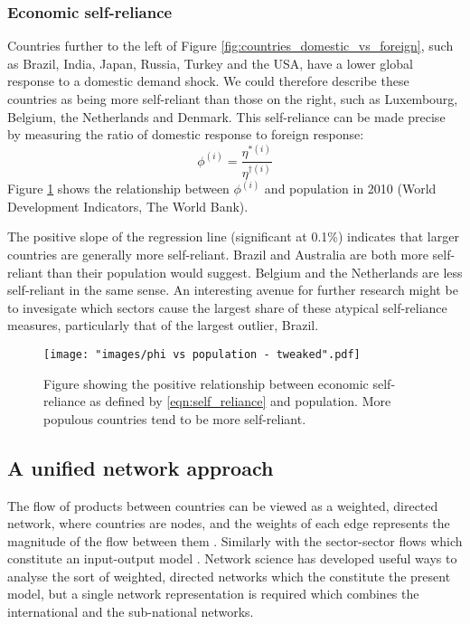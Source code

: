 \documentclass[a4paper]{article}
\begin{document}
\subsubsection*{Economic self-reliance}
Countries further to the left of Figure \ref{fig:countries_domestic_vs_foreign}, such as Brazil, India, Japan, Russia, Turkey and the USA, have a lower global response to a domestic demand shock.
We could therefore describe these countries as being more self-reliant than those on the right, such as Luxembourg, Belgium, the Netherlands and Denmark.
This self-reliance can be made precise by measuring the ratio of domestic response to foreign response:
\begin{equation}\label{eqn:self_reliance}
\phi^{(i)} = \frac{\eta^{*(i)}}{\eta^{\dagger(i)}}
\end{equation}
Figure \ref{fig:phi-vs-pop} shows the relationship between $\phi^{(i)}$ and population in 2010 (World Development Indicators, The World Bank).

The positive slope of the regression line (significant at 0.1\%) indicates that larger countries are generally more self-reliant.
Brazil and Australia are both more self-reliant than their population would suggest.
Belgium and the Netherlands are less self-reliant in the same sense.
An interesting avenue for further research might be to invesigate which sectors cause the largest share of these atypical self-reliance measures, particularly that of the largest outlier, Brazil.

\begin{figure}[tb]
\centering
\texttt{[image: "images/phi vs population - tweaked".pdf]}
\caption{Figure showing the positive relationship between economic self-reliance as defined by \cref{eqn:self_reliance} and population. More populous countries tend to be more self-reliant.}
\label{fig:phi-vs-pop}
\end{figure}

\subsection{A unified network approach}\label{sec:networkapproach}
The flow of products between countries can be viewed as a weighted, directed network, where countries are nodes, and the weights of each edge represents the magnitude of the flow between them \parencite{nystuen_graph_1961,serrano_topology_2003,bhattacharya_international_2008,baskaran_heckscher-ohlin_2011}.
Similarly with the sector-sector flows which constitute an input-output model \parencite{blochl_vertex_2011,fedriani_simplifying_2012}.
Network science has developed useful ways to analyse the sort of weighted, directed networks which the constitute the present model, but a single network representation is required which combines the international and the sub-national networks.
\end{document}
